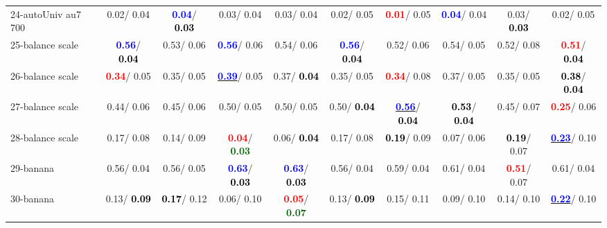 \begin{table}[h]
\begin{center}
{\begin{tabular}{lc|c|c|c|c|c|c|c|c}
24-autoUniv au7 700 &   0.02/  0.04 & \textcolor{blue}{\textbf{  0.04}}/\textcolor{black}{\textbf{  0.03}} &   0.03/  0.04 &   0.03/  0.04 &   0.02/  0.05 & \textcolor{red}{\textbf{  0.01}}/  0.05 & \textcolor{blue}{\textbf{  0.04}}/  0.04 &   0.03/\textcolor{black}{\textbf{  0.03}} &   0.02/  0.05 \\
25-balance scale & \textcolor{blue}{\textbf{  0.56}}/\textcolor{black}{\textbf{  0.04}} &   0.53/  0.06 & \textcolor{blue}{\textbf{  0.56}}/  0.06 &   0.54/  0.06 & \textcolor{blue}{\textbf{  0.56}}/\textcolor{black}{\textbf{  0.04}} &   0.52/  0.06 &   0.54/  0.05 &   0.52/  0.08 & \textcolor{red}{\textbf{  0.51}}/\textcolor{black}{\textbf{  0.04}} \\
26-balance scale & \textcolor{red}{\textbf{  0.34}}/  0.05 &   0.35/  0.05 & \underline{\textcolor{blue}{\textbf{  0.39}}}/  0.05 &   0.37/\textcolor{black}{\textbf{  0.04}} &   0.35/  0.05 & \textcolor{red}{\textbf{  0.34}}/  0.08 &   0.37/  0.05 &   0.35/  0.05 & \textcolor{black}{\textbf{  0.38}}/\textcolor{black}{\textbf{  0.04}} \\
27-balance scale &   0.44/  0.06 &   0.45/  0.06 &   0.50/  0.05 &   0.50/  0.05 &   0.50/\textcolor{black}{\textbf{  0.04}} & \underline{\textcolor{blue}{\textbf{  0.56}}}/\textcolor{black}{\textbf{  0.04}} & \textcolor{black}{\textbf{  0.53}}/\textcolor{black}{\textbf{  0.04}} &   0.45/  0.07 & \textcolor{red}{\textbf{  0.25}}/  0.06 \\
28-balance scale &   0.17/  0.08 &   0.14/  0.09 & \textcolor{red}{\textbf{  0.04}}/\textcolor{darkgreen}{\textbf{  0.03}} &   0.06/\textcolor{black}{\textbf{  0.04}} &   0.17/  0.08 & \textcolor{black}{\textbf{  0.19}}/  0.09 &   0.07/  0.06 & \textcolor{black}{\textbf{  0.19}}/  0.07 & \underline{\textcolor{blue}{\textbf{  0.23}}}/  0.10 \\ \hline
29-banana &   0.56/  0.04 &   0.56/  0.05 & \textcolor{blue}{\textbf{  0.63}}/\textcolor{black}{\textbf{  0.03}} & \textcolor{blue}{\textbf{  0.63}}/\textcolor{black}{\textbf{  0.03}} &   0.56/  0.04 &   0.59/  0.04 &   0.61/  0.04 & \textcolor{red}{\textbf{  0.51}}/  0.07 &   0.61/  0.04 \\
30-banana &   0.13/\textcolor{black}{\textbf{  0.09}} & \textcolor{black}{\textbf{  0.17}}/  0.12 &   0.06/  0.10 & \textcolor{red}{\textbf{  0.05}}/\textcolor{darkgreen}{\textbf{  0.07}} &   0.13/\textcolor{black}{\textbf{  0.09}} &   0.15/  0.11 &   0.09/  0.10 &   0.14/  0.10 & \underline{\textcolor{blue}{\textbf{  0.22}}}/  0.10 \\

\end{tabular}}
\end{center}
\end{table}
